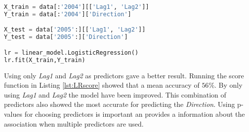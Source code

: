 \begin{lstlisting}[language=Python, label=lst:OnlyLag1Lag2, caption=Logistic regression using only Lag1 and Lag2 as predictors]
X_train = data[:'2004'][['Lag1', 'Lag2']]
Y_train = data[:'2004']['Direction']

X_test = data['2005':][['Lag1', 'Lag2']]
Y_test = data['2005':]['Direction']

lr = linear_model.LogisticRegression()
lr.fit(X_train,Y_train)
\end{lstlisting}

Using only \emph{Lag1} and \emph{Lag2} as predictors gave a better result. Running the score function in Listing \ref{lst:LRscore} showed that a mean accuracy of $56\%$. By only using \emph{Lag1} and \emph{Lag2} the model have been improved. This combination of predictors also showed the most accurate for predicting the \emph{Direction}. Using p-values for choosing predictors is important an provides a information about the association when multiple predictors are used.






